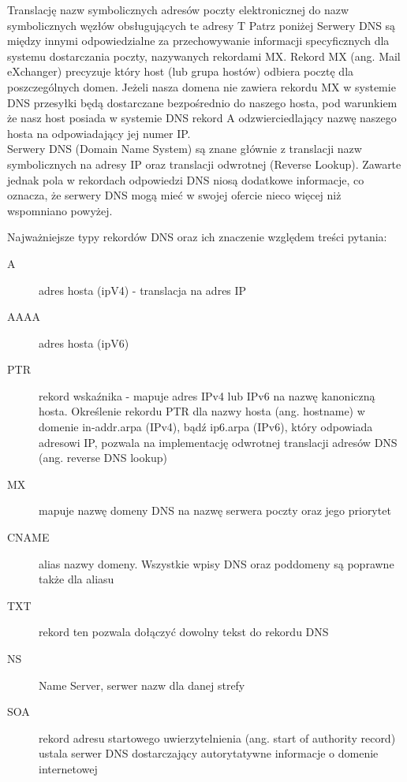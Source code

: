 \vspace{0.4cm}
\noindent 
{Translację nazw symbolicznych adresów poczty elektronicznej do nazw symbolicznych węzłów obsługujących te adresy}
{T}
{Patrz poniżej}
{Serwery DNS są między innymi odpowiedzialne za przechowywanie informacji specyficznych dla systemu dostarczania poczty, nazywanych rekordami MX. Rekord MX (ang. Mail eXchanger) precyzuje który host (lub grupa hostów) odbiera pocztę dla poszczególnych domen. Jeżeli nasza domena nie zawiera rekordu MX w systemie DNS przesyłki będą dostarczane bezpośrednio do naszego hosta, pod warunkiem że nasz host posiada w systemie DNS rekord A odzwierciedlający nazwę naszego hosta na odpowiadający jej numer IP. \\

Serwery DNS (Domain Name System) są znane głównie z translacji nazw symbolicznych na adresy IP oraz translacji odwrotnej (Reverse Lookup). Zawarte jednak pola w rekordach odpowiedzi DNS niosą dodatkowe informacje, co oznacza, że serwery DNS mogą mieć w swojej ofercie nieco więcej niż wspomniano powyżej.\\}

\vspace{0.4cm}
Najważniejsze typy rekordów DNS oraz ich znaczenie względem treści pytania:
\begin{description}
\item[A] adres hosta (ipV4) - translacja na adres IP
\item[AAAA]  adres hosta (ipV6) 
\item[PTR]  	
	rekord wskaźnika - mapuje adres IPv4 lub IPv6 na nazwę kanoniczną hosta. 		Określenie rekordu PTR dla nazwy hosta (ang. hostname) w domenie in-addr.arpa 	(IPv4), bądź ip6.arpa (IPv6), który odpowiada adresowi IP, pozwala na 			implementację odwrotnej translacji adresów DNS (ang. reverse DNS lookup) 
\item[MX] mapuje nazwę domeny DNS na nazwę serwera poczty oraz jego priorytet 
\item[CNAME]	alias nazwy domeny. Wszystkie wpisy DNS oraz poddomeny są 	poprawne także dla aliasu 
\item[TXT]	rekord ten pozwala dołączyć dowolny tekst do rekordu DNS 
\item[NS] Name Server, serwer nazw dla danej strefy 
\item[SOA]    rekord adresu startowego uwierzytelnienia (ang. start of authority record) ustala serwer DNS dostarczający autorytatywne informacje o domenie internetowej 
\end{description}


